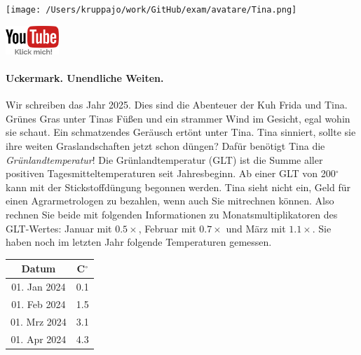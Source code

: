 \documentclass[a4paper, 9pt]{scrartcl}\usepackage[]{graphicx}\usepackage[]{xcolor}
\begin{document}
 
\ifcollection
\begin{flushright}
\tiny\vspace{-3Ex}
\textbf{\examinhaltstart}
\exammodulemathstat
\vspace{-4Ex}
\end{flushright}
\begin{minipage}[t]{0.5\textwidth}
\texttt{[image: /Users/kruppajo/work/GitHub/exam/avatare/Tina.png]}
\end{minipage}
\begin{minipage}[t]{0.5\textwidth}
\hfill
\href{https://youtu.be/fiWGgCX-cE4}{\includegraphics[width = 2cm]{img/youtube}}
\end{minipage}
\fi






\ifcollection
\paragraph{Uckermark. Unendliche Weiten.}
\fi



Wir schreiben das Jahr 2025. Dies sind die Abenteuer der Kuh Frida und Tina. Grünes Gras unter Tinas Füßen und ein strammer Wind im Gesicht, egal wohin sie schaut. Ein schmatzendes Geräusch ertönt unter Tina. Tina sinniert, sollte sie ihre weiten Graslandschaften jetzt schon düngen? Dafür benötigt Tina die \textit{Grünlandtemperatur}! Die Grünlandtemperatur (GLT) ist die Summe aller positiven Tagesmitteltemperaturen seit Jahresbeginn. Ab einer GLT von 200$^\circ$ kann mit der Stickstoffdüngung begonnen werden. Tina sieht nicht ein, Geld für einen Agrarmetrologen zu bezahlen, wenn auch Sie mitrechnen können. Also rechnen Sie beide mit folgenden Informationen zu Monatsmultiplikatoren des GLT-Wertes: Januar mit $0.5\times$, Februar mit $0.7\times$ und März mit
$1.1\times$. Sie haben noch im letzten Jahr folgende Temperaturen gemessen.

\begin{center}
\begin{tabular}{cc}
  \toprule
  Datum & C$^\circ$ \\
  \midrule
  01. Jan 2024 & 0.1\\
  01. Feb 2024 & 1.5\\
  01. Mrz 2024 & 3.1\\
  01. Apr 2024 & 4.3\\
  \bottomrule
\end{tabular}
\end{center}
\end{document}
